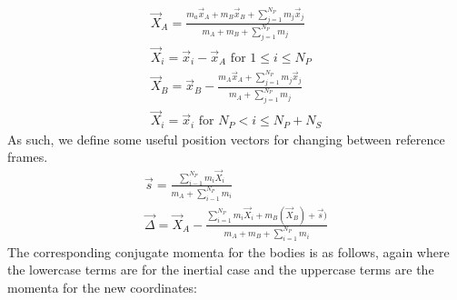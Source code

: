 \documentclass{aastex631}
\begin{document}
\begin{equation}
    \begin{split}
        \vec{X}_A = \frac{m_a\vec{x}_A+m_B\vec{x}_B+\sum_{j=1}^{N_P}m_j\vec{x}_j}{m_A+m_B+\sum_{j=1}^{N_P}m_j} \\
        \vec{X}_i = \vec{x}_i-\vec{x}_A \text{   for   } 1\leq i \leq N_P \\ 
        \vec{X}_B = \vec{x}_B-\frac{m_A\vec{x}_A+\sum_{j=1}^{N_P}m_j\vec{x}_j}{m_A+\sum_{j=1}^{N_P}m_j} \\
        \vec{X}_i = \vec{x}_i \text{   for   } N_P < i \leq N_P+N_S
     \end{split}
\label{positions}
\end{equation}
As such, we define some useful position vectors for changing between reference frames. \\
\begin{equation}
\begin{split}
    \vec{s} = \frac{\sum_{i-1}^{N_P}m_i\vec{X}_i}{m_A+\sum_{i-1}^{N_P}m_i}\\
    \vec{\Delta} = \vec{X}_A-\frac{\sum_{i=1}^{N_P}m_i\vec{X}_i+m_B(\vec{X}_B)+\vec{s})}{m_A+m_B+\sum_{i=1}^{N_P}m_i}
\end{split}
\end{equation}
The corresponding conjugate momenta for the bodies is as follows, again where the lowercase terms are for the inertial case and the uppercase terms
are the momenta for the new coordinates:
\end{document}

